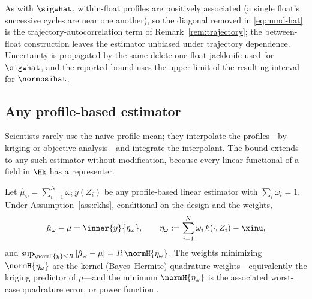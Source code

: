As with $\sigwhat$, within-float profiles are positively associated (a single
float's successive cycles are near one another), so the diagonal removed in
\eqref{eq:mmd-hat} is the trajectory-autocorrelation term of
Remark~\ref{rem:trajectory}; the between-float construction leaves the estimator
unbiased under trajectory dependence. Uncertainty is propagated by the same
delete-one-float jackknife used for $\sigwhat$, and the reported bound uses the
upper limit of the resulting interval for $\normpsihat$.

\subsection{Any profile-based estimator}
\label{sec:rkhs-estimators}

Scientists rarely use the naive profile mean; they interpolate the profiles---by
kriging or objective analysis---and integrate the interpolant. The bound extends
to any such estimator without modification, because every linear functional of a
field in $\Hk$ has a representer.

\begin{proposition}
\label{prop:rkhs-estimator}
Let $\hat\mu_\omega=\sum_{i=1}^{N}\omega_i\,y(Z_i)$ be any profile-based linear
estimator with $\sum_i\omega_i=1$. Under Assumption~\ref{ass:rkhs}, conditional
on the design and the weights,
\[
  \hat\mu_\omega-\mu=\inner{y}{\eta_\omega},
  \qquad
  \eta_\omega:=\sum_{i=1}^{N}\omega_i\,k(\cdot,Z_i)-\xinu,
\]
and $\sup_{\normH{y}\le R}|\hat\mu_\omega-\mu|=R\,\normH{\eta_\omega}$. The
weights minimizing $\normH{\eta_\omega}$ are the kernel (Bayes--Hermite)
quadrature weights---equivalently the kriging predictor of $\mu$---and the
minimum $\normH{\eta_\omega}$ is the associated worst-case quadrature error, or
power function \citep{ohagan1991,micchelli1977,donoho1994}.
\end{proposition}

